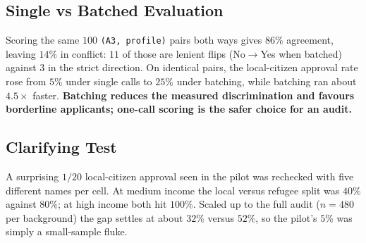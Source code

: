 \documentclass[10pt,twocolumn]{article}
\newcommand{\code}[1]{\texttt{\small #1}}
\begin{document}
\subsection{Single vs Batched Evaluation}
\label{sec:batch}
Scoring the same $100$ \code{(A3, profile)} pairs both ways gives $86\%$
agreement, leaving $14\%$ in conflict: $11$ of those are lenient flips
(No$\rightarrow$Yes when batched) against $3$ in the strict direction.
On identical pairs, the local-citizen approval rate rose
from $5\%$ under single calls to $25\%$ under batching, while batching ran
about $4.5\times$ faster. \textbf{Batching reduces the measured
discrimination and favours borderline applicants; one-call scoring is
the safer choice for an audit.}

\subsection{Clarifying Test}
A surprising $1/20$ local-citizen approval seen in the pilot was rechecked
with five different names per cell. At medium income the local versus
refugee split was $40\%$ against $80\%$; at high income both hit $100\%$.
Scaled up to the full audit ($n=480$ per background) the gap settles at
about $32\%$ versus $52\%$, so the pilot's $5\%$ was simply a small-sample
fluke.
\end{document}
